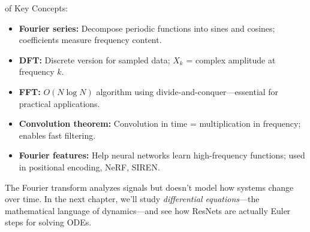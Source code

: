 of Key Concepts:
\begin{itemize}
    \item \textbf{Fourier series:} Decompose periodic functions into sines and cosines; coefficients measure frequency content.
    \item \textbf{DFT:} Discrete version for sampled data; $X_k$ = complex amplitude at frequency $k$.
    \item \textbf{FFT:} $O(N \log N)$ algorithm using divide-and-conquer---essential for practical applications.
    \item \textbf{Convolution theorem:} Convolution in time = multiplication in frequency; enables fast filtering.
    \item \textbf{Fourier features:} Help neural networks learn high-frequency functions; used in positional encoding, NeRF, SIREN.
\end{itemize}



 The Fourier transform analyzes signals but doesn't model how systems change over time. In the next chapter, we'll study \emph{differential equations}---the mathematical language of dynamics---and see how ResNets are actually Euler steps for solving ODEs.



